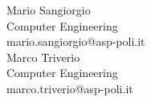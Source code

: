 {\begin{flushright}
  Mario Sangiorgio\\Computer Engineering\\mario.sangiorgio@asp-poli.it \\ 
      Marco Triverio\\Computer Engineering\\marco.triverio@asp-poli.it \\ 


\end{flushright}
\begin{center}



\end{center} \clearpage
}
